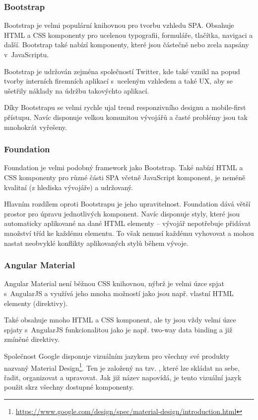 \subsubsection*{Bootstrap}

Bootstrap je velmi populární knihovnou pro tvorbu vzhledu SPA. Obsahuje HTML a CSS komponenty pro ucelenou typografii, formuláře, tlačítka, navigaci a další. Bootstrap také nabízí komponenty, které jsou částečně nebo zcela napsány v~JavaScriptu.

Bootstrap je udržován zejména společností Twitter, kde také vznikl na popud tvorby interních firemních aplikací s~uceleným vzhledem a také UX, aby se ušetřily náklady na údržbu takovýchto aplikací.

Díky Bootstrapu se velmi rychle ujal trend responzivního designu a mobile-first přístupu. Navíc disponuje velkou komunitou vývojářů a časté problémy jsou tak mnohokrát vyřešeny.

\subsubsection*{Foundation}

Foundation je velmi podobný framework jako Bootstrap. Také nabízí HTML a CSS komponenty pro různé části SPA včetně JavaScript komponent, je neméně kvalitní (z hlediska vývojáře) a udržovaný.

Hlavním rozdílem oproti Bootstrapu je jeho upravitelnost. Foundation dává větší prostor pro úpravu jednotlivých komponent. Navíc disponuje styly, které jsou automaticky aplikované na dané HTML elementy -- vývojář nepotřebuje přidávat množství tříd ke každému elementu. To však nemusí každému vyhovovat a mohou nastat neobvyklé konflikty aplikovaných stylů během vývoje.

\subsubsection*{Angular Material}

Angular Material není běžnou CSS knihovnou, nýbrž je velmi úzce spjat s~AngularJS a využívá jeho mnoha možností jako jsou např. vlastní HTML elementy (direktivy).

Také obsahuje mnoho HTML a CSS komponent, ale ty jsou vždy velmi úzce spjaty s~AngularJS funkcionalitou jako je např. two-way data binding a již zmíněné direktivy. 

Společnost Google disponuje vizuálním jazykem pro všechny své produkty nazvaný Material Design\footnote{\url{https://www.google.com/design/spec/material-design/introduction.html}}. Ten je založený na tzv. , které lze skládat na sebe, řadit, organizovat a upravovat. Jak již název napovídá, je tento vizuální jazyk použit skrz všechny dostupné komponenty.

